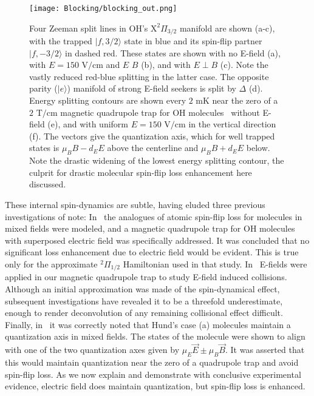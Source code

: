 \documentclass[%
 reprint,
 amsmath,amssymb,
 aps,
prl,
]{revtex4-1}
\newcommand{\epb}{{$E\!\perp\!B$}}
\begin{document}

\begin{figure}[tb]
\texttt{[image: Blocking/blocking\_out.png]}%
\caption{
Four Zeeman split lines in OH's $\mathrm{X}^2\Pi_{3/2}$ manifold are shown (a-c), with the trapped $|f,3/2\rangle$ state in blue and its spin-flip partner $|f,-3/2\rangle$ in dashed red. These states are shown with no E-field (a), with $E=150\text{ V/cm}$ and $E\,$\raisebox{0.5px}{$\parallel$}$\,B$ (b), and with \epb{} (c). Note the vastly reduced red-blue splitting in the latter case. The opposite parity ($|e\rangle$) manifold of strong E-field seekers is split by $\Delta$ (d). Energy splitting contours are shown every $2\text{ mK}$ near the zero of a $2\text{ T/cm}$ magnetic quadrupole trap for OH molecules~\cite{Stuhl2012uwave} without E-field (e), and with uniform $E=150\text{ V/cm}$ in the vertical direction (f). The vectors give the quantization axis, which for well trapped states is $\mu_BB-d_EE$ above the centerline and $\mu_BB+d_EE$ below. Note the drastic widening of the lowest energy splitting contour, the culprit for drastic molecular spin-flip loss enhancement here discussed.
\label{fig:blocking}}
\end{figure}


These internal spin-dynamics are subtle, having eluded three previous investigations of note: In~\cite{Lara2008} the analogues of atomic spin-flip loss for molecules in mixed fields were modeled, and a magnetic quadrupole trap for OH molecules with superposed electric field was specifically addressed. It was concluded that no significant loss enhancement due to electric field would be evident. This is true only for the approximate $^2\Pi_{1/2}$ Hamiltonian used in that study. In~\cite{Stuhl2013} E-fields were applied in our magnetic quadrupole trap to study E-field induced collisions. Although an initial approximation was made of the spin-dynamical effect, subsequent investigations have revealed it to be a threefold underestimate, enough to render deconvolution of any remaining collisional effect difficult. Finally, in~\cite{Bohn2013} it was correctly noted that Hund's case (a) molecules maintain a quantization axis in mixed fields. The states of the molecule were shown to align with one of the two quantization axes given by $\mu_E\vec{E}\pm\mu_B\vec{B}$. It was asserted that this would maintain quantization near the zero of a quadrupole trap and avoid spin-flip loss. As we now explain and demonstrate with conclusive experimental evidence, electric field does maintain quantization, but spin-flip loss is enhanced.
\end{document}

